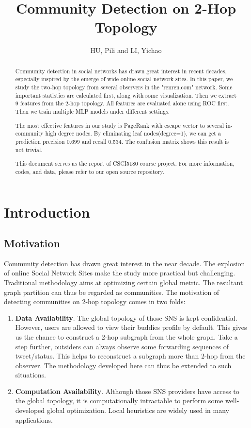 \documentclass[11pt,a4paper]{article}
\author{HU, Pili and LI, Yichao}
\title{Community Detection on 2-Hop Topology}
\begin{document}
\maketitle

\begin{abstract}
	Community detection in social networks has drawn great interest
	in recent decades, especially inspired by the emerge of wide 
	online social network sites. In this paper, we study the two-hop 
	topology from several observers in the "renren.com" network. 
	Some important statistics are calculated first, along with 
	some visualization. Then we extract 9 features from the 
	2-hop topology. All features are evaluated alone using ROC first. 
	Then we train multiple MLP models under different settings. 
	
	The most effective features in our study is PageRank with escape
	vector to several in-community high degree nodes. 
	By eliminating leaf nodes(degree=1), we can get a prediction
	precision 0.699 and recall 0.534. The confusion matrix shows 
	this result is not trivial. 

	This document serves as the report of CSCI5180 course 
	project\cite{csci5180_lecture,csci5180_tutorial}. 
	For more information, codes, and data, please refer to 
	our open source repository\cite{hu2011-cd2hop}. 
	
\end{abstract}

\pagebreak
\tableofcontents
\pagebreak

\section{Introduction}

\subsection{Motivation}

Community detection has drawn great interest in the near decade. 
The explosion of online Social Network Sites make the study more 
practical but challenging. Traditional methodology aims at 
optimizing certain global metric. The resultant graph partition 
can thus be regarded as communities. The motivation of detecting 
communities on 2-hop topology comes in two folds: 
\begin{enumerate}
	\item \textbf{Data Availability}. The global topology of 
	those SNS is kept confidential. However, users are allowed 
	to view their buddies profile by default. This gives us the 
	chance to construct a 2-hop subgraph from the whole graph. 
	Take a step further, outsiders can always observe some forwarding 
	sequences of tweet/status. This helps to reconstruct a 
	subgraph more than 2-hop from the observer. The methodology 
	developed here can thus be extended to such situations. 
	\item \textbf{Computation Availability}. Although those SNS 
	providers have access to the global topology, it is computationally
	intractable to perform some well-developed global optimization. 
	Local heuristics are widely used in many applications. 
\end{enumerate}
\end{document}
